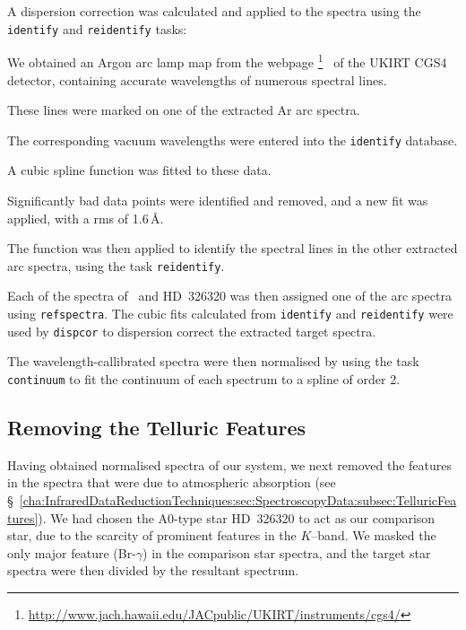 \vspace{\myparskip}

A dispersion correction was calculated and applied to the spectra using the \texttt{identify} and \texttt{reidentify} tasks: %
\begin{inparaenum}[(i)]
\item
We obtained an Argon arc lamp map from the webpage%
\footnote{%
\label{cha:AccretionDiskContamination:sec:Spectroscopy:subsec:InitialReduction:foot:CGS4}
\url{http://www.jach.hawaii.edu/JACpublic/UKIRT/instruments/cgs4/} }%
\ of the UKIRT CGS4 detector, containing accurate wavelengths of
numerous spectral lines.
\item
These lines were marked on one of the
extracted Ar arc spectra.
\item
The corresponding vacuum wavelengths were
entered into the \texttt{identify} database.
\item
A cubic spline function
was fitted to these data.
\item
Significantly bad data points
were identified and removed, and a new fit was applied, with a rms of
1.6\,\AA.
\item The function was then applied to identify the spectral lines in the other
extracted arc spectra, using the task \texttt{reidentify}. %
\end{inparaenum}

\vspace{\myparskip}

Each of the spectra of \groj\ and \mbox{HD 326320}
was then assigned one of the arc spectra using
\texttt{refspectra}. The cubic fits calculated from \texttt{identify}
and \texttt{reidentify} were used by \texttt{dispcor} to dispersion
correct the extracted target spectra. %

\vspace{\myparskip}

The wavelength-callibrated spectra were then normalised by using the
task \texttt{continuum} to fit the continuum of each spectrum to a
spline of order 2. %


\subsection{Removing the Telluric Features}
\label{cha:AccretionDiskContamination:sec:Spectroscopy:subsec:TelluricFeatures}

Having obtained normalised spectra of our system, we next removed the features in the spectra that were due to atmospheric absorption (see \S~\ref{cha:InfraredDataReductionTechniques:sec:SpectroscopyData:subsec:TelluricFeatures}). We had chosen the A0-type star \mbox{HD 326320} to act as our comparison star, due to the scarcity of prominent features in the $K$--band. We masked the only major feature (Br-$\gamma$) in the comparison star spectra, and the target star spectra were then divided by the
resultant spectrum. %

